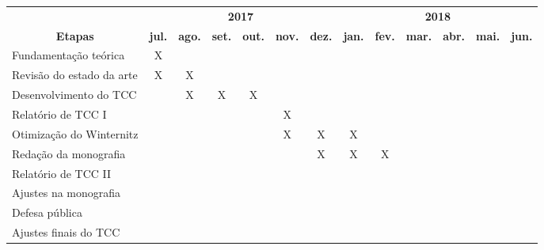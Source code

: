 \documentclass[11pt]{letter}
\begin{document}
\begin{center}
  \begin{tabular}{|p{4.04cm}|*{12}{c|}}
    \hline & \multicolumn{6}{c|}{\textbf{2017}}
      & \multicolumn{6}{c|}{\textbf{2018}} \\ \cline{2-13}
    \multicolumn{1}{|c|}{\multirow{-2}{*}{\textbf{Etapas}}}
      & \textbf{jul.} & \textbf{ago.} & \textbf{set.}
      & \textbf{out.} & \textbf{nov.} & \textbf{dez.}
      & \textbf{jan.} & \textbf{fev.} & \textbf{mar.}
      & \textbf{abr.} & \textbf{mai.} & \textbf{jun.} \\
    \hline Fundamentação teórica
      & \cellcolor{lightgray} X & & & & & & & & & & & \\
    \hline Revisão do estado da arte
      & \cellcolor{lightgray} X & \cellcolor{lightgray} X & & & & & & & & & & \\
      \hline Desenvolvimento do TCC
      & & \cellcolor{lightgray} X & \cellcolor{lightgray} X
      & \cellcolor{lightgray} X & & & & & & & & \\
    \hline Relatório de TCC I
      & & & & & \cellcolor{lightgray} X & & & & & & & \\
      \hline Otimização do Winternitz & & & & & \cellcolor{lightgray} X
      & \cellcolor{lightgray} X & \cellcolor{lightgray} X & & & & & \\
    \hline Redação da monografia
      & & & & & & \cellcolor{lightgray} X & \cellcolor{lightgray} X
      & \cellcolor{lightgray} X & \cellcolor{lightgray} & \cellcolor{lightgray}
      & \cellcolor{lightgray} & \\
    \hline Relatório de TCC II
      & & & & & & & & & & & \cellcolor{lightgray} & \\
    \hline Ajustes na monografia
      & & & & & & & & & & & \cellcolor{lightgray} & \cellcolor{lightgray} \\
    \hline Defesa pública
      & & & & & & & & & & & & \cellcolor{lightgray} \\
    \hline Ajustes finais do TCC
      & & & & & & & & & & & & \cellcolor{lightgray} \\
    \hline
  \end{tabular}

  \vspace*{\fill}
\end{center}
\end{document}
